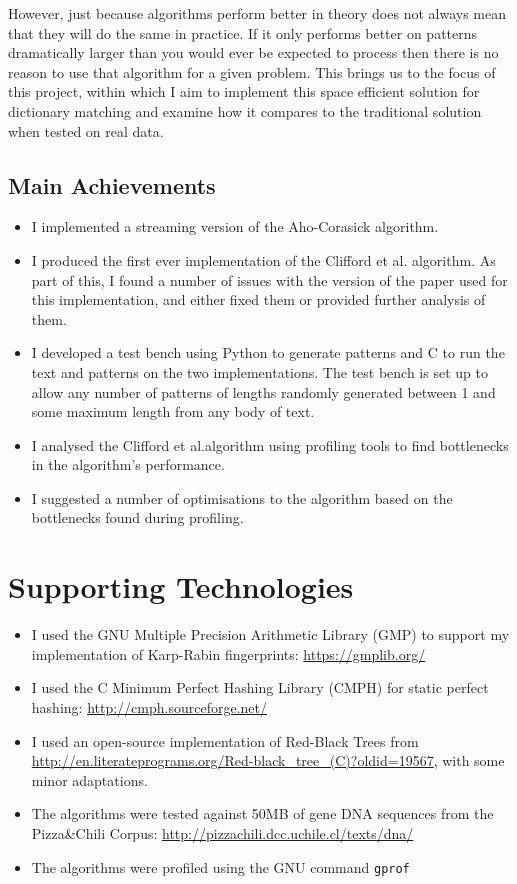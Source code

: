 \documentclass[ %
                    author={Dominic Joseph Moylett},
                    degree={MEng},
                     title={Dictionary Matching with Fingerprints},
                  subtitle={An Empirical Analysis},
                      type={research},
                      year={2015} ]{dissertation}
\begin{document}
However, just because algorithms perform better in theory does not always mean that they will do the same in practice. If it only performs better on patterns dramatically larger than you would ever be expected to process then there is no reason to use that algorithm for a given problem. This brings us to the focus of this project, within which I aim to implement this space efficient solution for dictionary matching and examine how it compares to the traditional solution when tested on real data.

\section*{Main Achievements}

\begin{itemize}
  \item I implemented a streaming version of the Aho-Corasick \cite{Aho:1975:ESM:360825.360855} algorithm.
  \item I produced the first ever implementation of the Clifford et al.\@ \cite{2015arXiv150406242C} algorithm. As part of this, I found a number of issues with the version of the paper used for this implementation, and either fixed them or provided further analysis of them.
  \item I developed a test bench using Python to generate patterns and C to run the text and patterns on the two implementations. The test bench is set up to allow any number of patterns of lengths randomly generated between 1 and some maximum length from any body of text.
  \item I analysed the Clifford et al.\@ algorithm using profiling tools to find bottlenecks in the algorithm's performance.
  \item I suggested a number of optimisations to the algorithm based on the bottlenecks found during profiling.
\end{itemize}

\chapter*{Supporting Technologies}
\label{ch:supporting-tech}

\begin{itemize}
\item I used the GNU Multiple Precision Arithmetic Library (GMP) to support my implementation of Karp-Rabin fingerprints: \url{https://gmplib.org/}
\item I used the C Minimum Perfect Hashing Library (CMPH) for static perfect hashing: \url{http://cmph.sourceforge.net/}
\item I used an open-source implementation of Red-Black Trees from \url{http://en.literateprograms.org/Red-black_tree_(C)?oldid=19567}, with some minor adaptations.
\item The algorithms were tested against 50MB of gene DNA sequences from the Pizza\&Chili Corpus: \url{http://pizzachili.dcc.uchile.cl/texts/dna/}
\item The algorithms were profiled using the GNU command \texttt{gprof}
\end{itemize}
\end{document}
